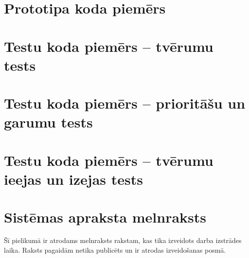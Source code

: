 \documentclass[12pt, a4paper]{article}
\begin{document}
\begin{appendices}

\newcommand{\ap}[1]{\section{#1}}
\renewcommand\thesection{\arabic{section} }

\ap{Prototipa koda piemērs}
\label{ap:code_sample}



\ap{Testu koda piemērs -- tvērumu tests}
\label{ap:test1_sample}



\ap{Testu koda piemērs -- prioritāšu un garumu tests}
\label{ap:test2_sample}



\ap{Testu koda piemērs -- tvērumu ieejas un izejas tests}
\label{ap:test3_sample}



\ap{Sistēmas apraksta melnraksts}
\label{ap:draft}

Šī pielikumā ir atrodams melnraksts rakstam, kas tika izveidots darba izstrādes laika. Raksts pagaidām netika publicēts un ir atrodas izveidošanas posmā.



\end{appendices}

{}


\reglapa
\end{document}
